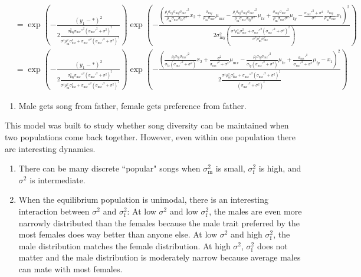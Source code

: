\documentclass{article}\usepackage[]{graphicx}\usepackage[]{color}
\newcommand{\x}[1]{\text{#1}}
\begin{document}
\begin{landscape}
\begin{align*}
\\&=\exp\left(-\frac{(y_1-*)^2}{2\frac{\sigma_{\x{m}y}^2\sigma_{\x{m}x}''^2(\sigma_{\x{m}x}'^2+\sigma^2)^2}{\sigma^4\rho_\x{m}^2\sigma_{\x{m}x}^2+\sigma_{\x{m}x}''^2(\sigma_{\x{m}x}'^2+\sigma^2)^2}}\right)\exp\left(-\frac{\left(\frac{\rho_\x{f}\sigma_{\x{f}y}\sigma_{\x{m}y}\sigma_{\x{m}x}'^2}{\rho_\x{m}\sigma_{\x{m}x}\sigma_{\x{f}x}\sigma^2}x_2+\frac{\sigma_{\x{m}y}}{\rho_\x{m}\sigma_{\x{m}x}}\mu_{\x{m}x}-\frac{\rho_\x{f}\sigma_{\x{f}y}\sigma_{\x{m}y}\sigma_{\x{m}x}'^2}{\rho_\x{m}\sigma_{\x{m}x}\sigma_{\x{f}y}\sigma^2}\mu_{\x{f}x}+\frac{\sigma_{\x{m}y}\sigma_{\x{m}x}'^2}{\rho_\x{m}\sigma_{\x{m}x}\sigma^2}\mu_{\x{f}y}-\frac{\sigma_{\x{m}x}'^2+\sigma^2}{\sigma^2}\frac{\sigma_{\x{m}y}}{\rho_\x{m}\sigma_{\x{m}x}}x_1\right)^2}{2\sigma_{\x{m}y}^2(\frac{\sigma^4\rho_\x{m}^2\sigma_{\x{m}x}^2+\sigma_{\x{m}x}''^2(\sigma_{\x{m}x}'^2+\sigma^2)^2}{\sigma^4\rho_\x{m}^2\sigma_{\x{m}x}^2})}\right)
\\&=\exp\left(-\frac{(y_1-*)^2}{2\frac{\sigma_{\x{m}y}^2\sigma_{\x{m}x}''^2(\sigma_{\x{m}x}'^2+\sigma^2)^2}{\sigma^4\rho_\x{m}^2\sigma_{\x{m}x}^2+\sigma_{\x{m}x}''^2(\sigma_{\x{m}x}'^2+\sigma^2)^2}}\right)\exp\left(-\frac{\left(\frac{\rho_\x{f}\sigma_{\x{f}y}\sigma_{\x{m}x}'^2}{\sigma_{\x{f}x}(\sigma_{\x{m}x}'^2+\sigma^2)}x_2+\frac{\sigma^2}{\sigma_{\x{m}x}'^2+\sigma^2}\mu_{\x{m}x}-\frac{\rho_\x{f}\sigma_{\x{f}y}\sigma_{\x{m}x}'^2}{\sigma_{\x{f}y}(\sigma_{\x{m}x}'^2+\sigma^2)}\mu_{\x{f}x}+\frac{\sigma_{\x{m}x}'^2}{\sigma_{\x{m}x}'^2+\sigma^2}\mu_{\x{f}y}-x_1\right)^2}{2\frac{\sigma^4\rho_\x{m}^2\sigma_{\x{m}x}^2+\sigma_{\x{m}x}''^2(\sigma_{\x{m}x}'^2+\sigma^2)^2}{(\sigma_{\x{m}x}'^2+\sigma^2)^2}}\right)
\end{align*}
\begin{enumerate}
\item Male gets song from father, female gets preference from father.
\end{enumerate}
\end{landscape}


This model was built to study whether song diversity can be maintained when two populations come back together. However, even within one population there are interesting dynamics.
\begin{enumerate}
\item There can be many discrete ``popular" songs when $\sigma_\text{m}^2$  is small, $\sigma_\text{f}^2$ is high, and $\sigma^2$ is intermediate.
\item When the equilibrium population is unimodal, there is an interesting interaction between $\sigma^2$ and $\sigma_\text{f}^2$: At low $\sigma^2$ and low $\sigma_\text{f}^2$, the males are even more narrowly distributed than the females because the male trait preferred by the most females does way better than anyone else. At low $\sigma^2$ and high $\sigma_\text{f}^2$, the male distribution matches the female distribution. At high $\sigma^2$, $\sigma_\text{f}^2$ does not matter and the male distribution is moderately narrow because average males can mate with most females. 
\end{enumerate}



\end{document}
